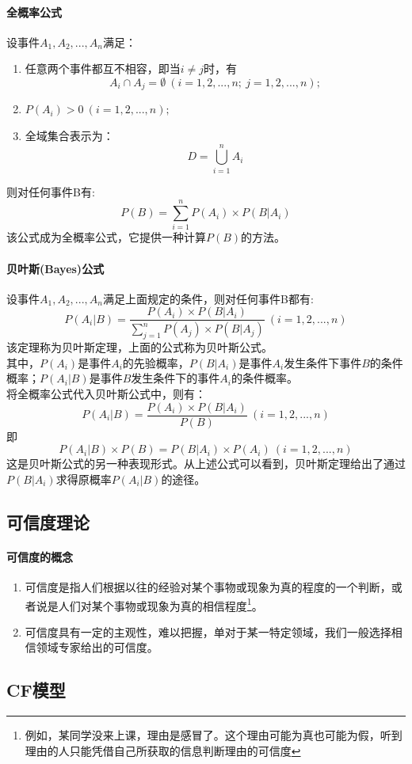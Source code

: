 \documentclass[12pt]{article}
\begin{document}
\paragraph{全概率公式}
设事件$A_1,A_2,...,A_n$满足：
\begin{enumerate}
	\item{任意两个事件都互不相容，即当$i \neq j$时，有
		$$A_i \cap A_j=\emptyset\ (i=1,2,...,n;\ j=1,2,...,n);$$}
	\item{$P(A_i)>0\ (i=1,2,...,n);$}
	\item{全域集合表示为：
		$$D=\bigcup_{i=1}^{n}A_i$$}
\end{enumerate}
则对任何事件B有: 
$$P(B)=\sum_{i=1}^{n}P(A_i)\times P(B|A_i)$$ 
该公式成为全概率公式，它提供一种计算$P(B)$的方法。
\paragraph{贝叶斯(Bayes)公式}
设事件$A_1,A_2,...,A_n$满足上面规定的条件，则对任何事件B都有:
$$P(A_i|B)=\frac{P(A_i)\times P(B|A_i)}{\sum\limits_{j=1}^nP(A_j)\times P(B|A_j)}\ (i=1,2,...,n)$$
该定理称为贝叶斯定理，上面的公式称为贝叶斯公式。\\
其中，$P(A_i)$是事件$A_i$的先验概率，$P(B|A_i)$是事件$A_i$发生条件下事件$B$的条件概率；$P(A_i|B)$是事件$B$发生条件下的事件$A_i$的条件概率。\\
将全概率公式代入贝叶斯公式中，则有：
$$P(A_i|B)=\frac{P(A_i)\times P(B|A_i)}{P(B)}\ (i=1,2,...,n)$$
即 $$P(A_i|B)\times P(B)=P(B|A_i)\times P(A_i)\ (i=1,2,...,n)$$
这是贝叶斯公式的另一种表现形式。从上述公式可以看到，贝叶斯定理给出了通过$P(B|A_i)$求得原概率$P(A_i|B)$的途径。
\subsection{可信度理论}
\paragraph{可信度的概念}
\begin{enumerate}
	\item{可信度是指人们根据以往的经验对某个事物或现象为真的程度的一个判断，或者说是人们对某个事物或现象为真的相信程度\footnote{例如，某同学没来上课，理由是感冒了。这个理由可能为真也可能为假，听到理由的人只能凭借自己所获取的信息判断理由的可信度}。}
	\item{可信度具有一定的主观性，难以把握，单对于某一特定领域，我们一般选择相信领域专家给出的可信度。}
\end{enumerate}
\subsection{CF模型}
\end{document}
